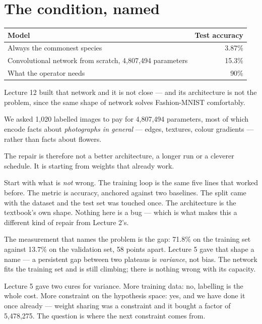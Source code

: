 \documentclass[11pt,a4paper]{article}
\begin{document}

\section{The condition, named}

\begin{center}
\small
\begin{tabular}{lr}
\toprule
\textbf{Model} & \textbf{Test accuracy} \\
\midrule
Always the commonest species & 3.87\% \\
Convolutional network from scratch, 4{,}807{,}494 parameters & 15.3\% \\
What the operator needs & 90\% \\
\bottomrule
\end{tabular}
\end{center}

Lecture 12 built that network and it is not close --- and its architecture is
not the problem, since the same shape of network solves Fashion-MNIST
comfortably.

\begin{keybox}[title={The diagnosis, in one sentence}]
We asked 1{,}020 labelled images to pay for 4{,}807{,}494 parameters, most of
which encode facts about \emph{photographs in general} --- edges, textures,
colour gradients --- rather than facts about flowers.

The repair is therefore not a better architecture, a longer run or a cleverer
schedule. It is starting from weights that already work.
\end{keybox}

Start with what is \emph{not} wrong. The training loop is the same five lines
that worked before. The metric is accuracy, anchored against two baselines. The
split came with the dataset and the test set was touched once. The architecture
is the textbook's own shape. Nothing here is a bug --- which is what makes this
a different kind of repair from Lecture 2's.

The measurement that names the problem is the gap: 71.8\% on the training set
against 13.7\% on the validation set, 58 points apart. Lecture 5 gave that
shape a name --- a persistent gap between two plateaus is \emph{variance}, not
bias. The network fits the training set and is still climbing; there is nothing
wrong with its capacity.

Lecture 5 gave two cures for variance. More training data: no, labelling is the
whole cost. More constraint on the hypothesis space: yes, and we have done it
once already --- weight sharing was a constraint and it bought a factor of
5{,}478{,}275. The question is where the next constraint comes from.
\end{document}
